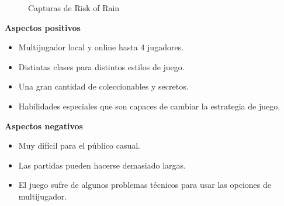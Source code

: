 \begin{figure}[H]
\begin{minipage}{0.40\textwidth}
        \label{RoR-Personajes}
    \end{minipage}
    \caption{Capturas de Risk of Rain}
\end{figure}

\textbf{Aspectos positivos}
\begin{itemize}
    \item Multijugador local y online hasta 4 jugadores.
    \item Distintas clases para distintos estilos de juego.
    \item Una gran cantidad de coleccionables y secretos.
    \item Habilidades especiales que son capaces de cambiar la estrategia de juego.
\end{itemize}

\textbf{Aspectos negativos}
\begin{itemize}
    \item Muy difícil para el público casual.
    \item Las partidas pueden hacerse demasiado largas.
    \item El juego sufre de algunos problemas técnicos para usar las opciones de multijugador.
\end{itemize}